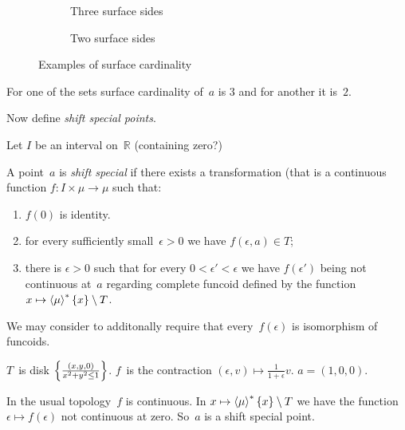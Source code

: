 \begin{figure}
  \begin{subfigure}[c]{0.3\textwidth}
    \centering
    \caption{Three surface sides}
  \end{subfigure}
  \begin{subfigure}[c]{0.3\textwidth}
    \centering
    \caption{Two surface sides}
  \end{subfigure}
  \caption{Examples of surface cardinality}
\end{figure}

For one of the sets surface cardinality of~$a$ is $3$ and for
another it is~$2$.

Now define \emph{shift special points}.

Let $I$ be an interval on~$\mathbb{R}$ (containing zero?)

A point~$a$ is \emph{shift special} if there exists a transformation
(that is a continuous function $f:I\times\mu\to\mu$ such that:
\begin{enumerate}
  \item $f(0)$ is identity. 
  \item for every sufficiently small~$\epsilon>0$ we have $f(\epsilon,a)\in T$;
  \item there is $\epsilon>0$ such that for every $0<\epsilon'<\epsilon$ we have
    $f(\epsilon')$ being not continuous at~$a$ regarding complete funcoid
    defined by the function $x\mapsto\left\langle \mu\right\rangle ^{\ast}\{x\}\setminus T$.
\end{enumerate}

We may consider to additonally require that every~$f(\epsilon)$ is isomorphism
of funcoids.

\begin{example}
$T$~is disk $\left\{ \frac{(x,y,0)}{x^2+y^2\leq 1}\right\}$. $f$~is the contraction
$(\epsilon,v)\mapsto\frac{1}{1+\epsilon}v$. $a=(1,0,0)$.

In the usual topology~$f$ is continuous. In
$x\mapsto\left\langle \mu\right\rangle ^{\ast}\{x\}\setminus T$ we have the function
$\epsilon\mapsto f(\epsilon)$ not continuous at zero.
So~$a$ is a shift special point.
\end{example}

